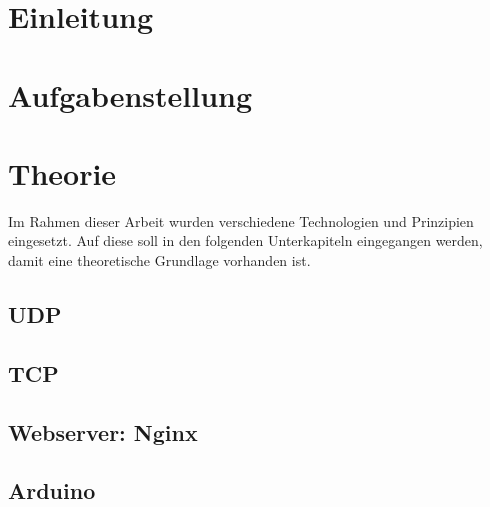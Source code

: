 \documentclass[ngerman]{scrartcl} %
\begin{document}
\tableofcontents
\newpage
 
\section{Einleitung}        
\label{sec:Einleitung-1}   

    

\newpage

\section{Aufgabenstellung}
\label{sec:Aufgabenstellung-1}



\newpage

\section{Theorie}        
\label{sec:Theorie-1}  

Im Rahmen dieser Arbeit wurden verschiedene Technologien und Prinzipien eingesetzt. Auf diese soll in den folgenden Unterkapiteln eingegangen werden, damit eine theoretische Grundlage vorhanden ist. 

\subsection{\ac{UDP}}
\label{sec:UDP-1}



\subsection{\ac{TCP}}
\label{sec:TCP-1}



\subsection{Webserver: Nginx}
\label{sec:Webserver: Nginx-1} 


 
\subsection{Arduino}
\label{sec:Arduino-1} 


\end{document}
